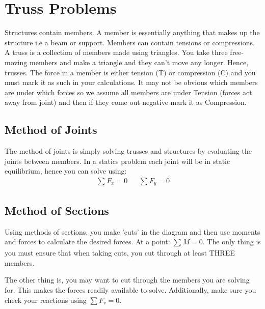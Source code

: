\documentclass[a4paper, 12pt]{article}
\begin{document}
\section{Truss Problems}
Structures contain members. A member is essentially anything that makes up the structure i.e a beam or support. 
Members can contain tensions or compressions. A truss is a collection of members made using triangles. You take
three free-moving members and make a triangle and they can't move any longer. Hence, trusses. The force in a 
member is either tension (T) or compression (C) and you must mark it as such in your calculations. 
It may not be obvious which members are under which forces so we assume all members are under Tension 
(forces act away from joint) and then if they come out negative mark it as Compression. 

\subsection{Method of Joints}
The method of joints is simply solving trusses and structures by evaluating the joints between members. 
In a statics problem each joint will be in static equilibrium, hence you can solve using:
\begin{align*}
    \sum_{}F_x=0 && \sum_{}F_y=0  
\end{align*}

\subsection{Method of Sections}
Using methods of sections, you make 'cuts' in the diagram and then use moments
and forces to calculate the desired forces. At a point: $\sum_{}M=0$. The only thing is
you must ensure that when taking cuts, you cut through at least THREE members. 

The other thing is, you may want to cut through the members you are solving for. This makes 
the forces readily available to solve. Additionally, make sure you check your reactions
using $\sum F_v = 0$. 
\end{document}
